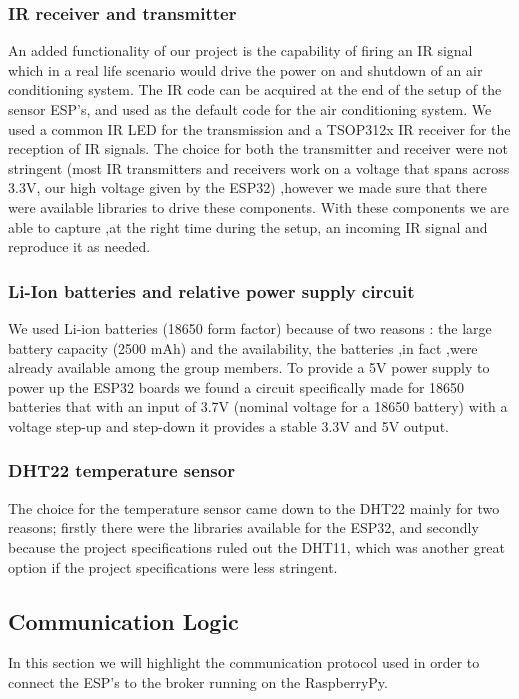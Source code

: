 \documentclass[a4paper]{article}
\begin{document}
        \subsubsection{IR receiver and transmitter}
        An added functionality of our project is the capability of firing an IR signal which in a real life scenario would drive the power on and shutdown of an air conditioning system. The IR code can be acquired at the end of the setup of the sensor ESP's, and used as the default code for the air conditioning system. We used a common IR LED for the transmission and a TSOP312x IR receiver for the reception of IR signals. The choice for both the transmitter and receiver were not stringent (most IR transmitters and receivers work on a voltage that spans across 3.3V, our high voltage given by the ESP32) ,however we made sure that there were available libraries to drive these components. With these components we are able to capture ,at the right time during the setup, an incoming IR signal and reproduce it as needed.
        
        \subsubsection{Li-Ion batteries and relative power supply circuit}
        We used Li-ion batteries (18650 form factor) because of two reasons : the large battery capacity (2500 mAh)  and the availability, the batteries ,in fact ,were already available among the group members. To provide a 5V power supply to power up the ESP32 boards we found a circuit specifically made for 18650 batteries that with an input of 3.7V (nominal voltage for a 18650 battery) with a voltage step-up and step-down it provides a stable 3.3V and 5V output.
        
        \subsubsection{DHT22 temperature sensor}
        The choice for the temperature sensor came down to the DHT22 mainly for two reasons; firstly there were the libraries available for the ESP32, and secondly because the project specifications ruled out the DHT11, which was another great option if the project specifications were less stringent.
        
        \subsection{Communication Logic}
        In this section we will highlight the communication protocol used in order to connect the ESP's to the broker running on the RaspberryPy.
        
\end{document}

